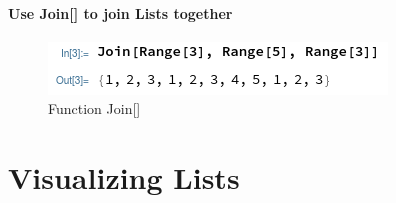 \documentclass{article}
\begin{document}
			\paragraph{Use Join[] to join Lists together}
			\begin{figure}[h!]
				\centering
				\includegraphics[width=0.7\linewidth]{pics/Join}
				\caption{Function Join[]}
				\label{fig:join}
			\end{figure}
		\section{Visualizing Lists}
		
		
		
			
			
			
			
				
				
\end{document}
